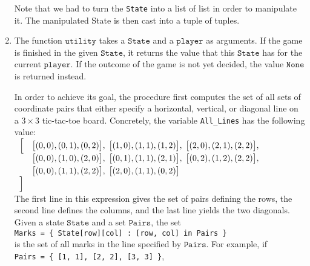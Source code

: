 \begin{enumerate}
      Note that we had to turn the \texttt{State} into a list of list in order to manipulate it.
      The manipulated State is then cast into a tuple of tuples.
\item The function $\texttt{utility}$ takes a $\texttt{State}$ and a $\texttt{player}$ as arguments.  If the game is 
      finished in the given $\texttt{State}$, it returns the value that this $\texttt{State}$ has for the
      current $\texttt{player}$.  If the outcome of the game is not yet decided, the value $\mathtt{None}$
      is returned instead. 
 
      In order to achieve its goal, the procedure first computes the set of all sets of coordinate pairs that 
      either specify a horizontal, vertical, or diagonal line on a $3 \times 3$ tic-tac-toe board.  Concretely,
      the variable \texttt{All\_Lines} has the following value:
      \\[0.2cm]
      \hspace*{1.3cm}
      $
      \begin{array}{ll}
       \Bigl[ & \bigl[(0, 0), (0, 1), (0, 2)\bigr], \;
                \bigl[(1, 0), (1, 1), (1, 2)\bigr], \;
                \bigl[(2, 0), (2, 1), (2, 2)\bigr],   \\[0.1cm]
              & \bigl[(0, 0), (1, 0), (2, 0)\bigr], \;
                \bigl[(0, 1), (1, 1), (2, 1)\bigr], \;
                \bigl[(0, 2), (1, 2), (2, 2)\bigr],   \\[0.1cm]
              & \bigl[(0, 0), (1, 1), (2, 2)\bigr], \;
                \bigl[(2, 0), (1, 1), (0, 2)\bigr]    \\
       \Bigr]
      \end{array}
      $
      \\[0.2cm]
      The first line in this expression gives the set of pairs defining the rows, the second line defines 
      the columns, and the last line yields the two diagonals.  Given a state $\texttt{State}$ and a set
      $\texttt{Pairs}$, the set 
      \\[0.2cm]
      \hspace*{1.3cm}
      \texttt{Marks = \{ State[row][col] : [row, col] in Pairs \}}
      \\[0.2cm]
      is the set of all marks in the line specified by $\texttt{Pairs}$.  For example, if 
      \\[0.2cm]
      \hspace*{1.3cm}
      \texttt{Pairs = \{ [1, 1], [2, 2], [3, 3] \}},
      \\[0.2cm]

\end{enumerate}
